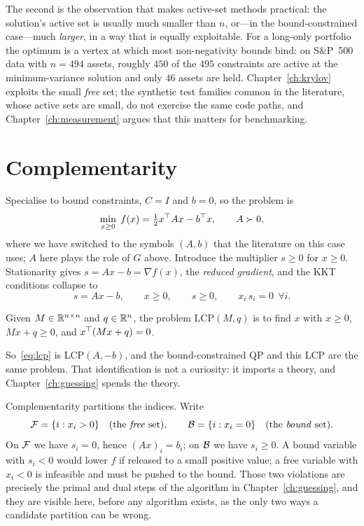 The second is the observation that makes active-set methods practical: the
solution's active set is usually much smaller than $n$, or---in the
bound-constrained case---much \emph{larger}, in a way that is equally exploitable.
For a long-only portfolio the optimum is a vertex at which most non-negativity
bounds bind: on S\&P~500 data with $n = 494$ assets, roughly $450$ of the $495$
constraints are active at the minimum-variance solution and only $46$ assets are
held. Chapter~\ref{ch:krylov} exploits the small \emph{free} set; the synthetic
test families common in the literature, whose active sets are small, do not
exercise the same code paths, and Chapter~\ref{ch:measurement} argues that this
matters for benchmarking.

\section{Complementarity}

Specialise to bound constraints, $C = I$ and $b = 0$, so the problem is
\begin{equation}
  \min_{x \ge 0} \; f(x) = \tfrac12 x^{\top} A x - b^{\top} x, \qquad A \succ 0,
  \label{eq:bqp}
\end{equation}
where we have switched to the symbols $(A,b)$ that the literature on this case
uses; $A$ here plays the role of $G$ above. Introduce the multiplier
$s \ge 0$ for $x \ge 0$. Stationarity gives $s = Ax - b = \nabla f(x)$, the
\emph{reduced gradient}, and the KKT conditions collapse to
\begin{equation}
  s = A x - b, \qquad x \ge 0, \qquad s \ge 0, \qquad x_i\,s_i = 0 \ \ \forall i.
  \label{eq:lcp}
\end{equation}

\begin{definition}
Given $M \in \mathbb{R}^{n\times n}$ and $q \in \mathbb{R}^n$, the problem
$\mathrm{LCP}(M,q)$ is to find $x$ with $x \ge 0$, $Mx + q \ge 0$, and
$x^{\top}(Mx+q) = 0$.
\end{definition}

So~\eqref{eq:lcp} is $\mathrm{LCP}(A,-b)$, and the bound-constrained QP and this
LCP are the same problem. That identification is not a curiosity: it imports a
theory, and Chapter~\ref{ch:guessing} spends the theory.

Complementarity partitions the indices. Write
\[
  \mathcal{F} = \{i : x_i > 0\}
  \quad\text{(the \emph{free} set)},
  \qquad
  \mathcal{B} = \{i : x_i = 0\}
  \quad\text{(the \emph{bound} set)}.
\]
On $\mathcal{F}$ we have $s_i = 0$, hence $(Ax)_i = b_i$; on $\mathcal{B}$ we have
$s_i \ge 0$. A bound variable with $s_i < 0$ would lower $f$ if released to a
small positive value; a free variable with $x_i < 0$ is infeasible and must be
pushed to the bound. Those two violations are precisely the primal and dual steps
of the algorithm in Chapter~\ref{ch:guessing}, and they are visible here, before
any algorithm exists, as the only two ways a candidate partition can be wrong.


